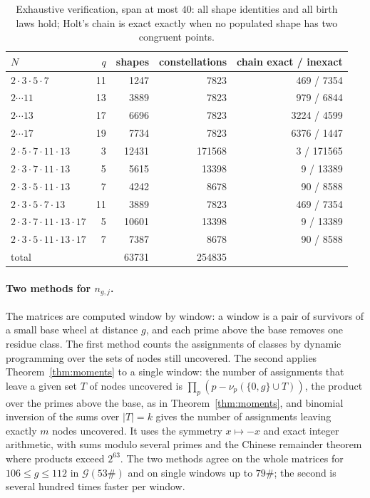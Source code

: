 \documentclass[11pt]{article}
\theoremstyle{definition}
\theoremstyle{remark}
\newcommand{\G}{\mathcal{G}}
\begin{document}
\begin{table}[ht]
\centering
\begin{tabular}{lrrrr}
\toprule
$N$ & $q$ & shapes & constellations & chain exact / inexact \\
\midrule
$2 \cdot 3 \cdot 5 \cdot 7$ & 11 & 1247 & 7823 & 469 / 7354 \\
$2 \cdots 11$ & 13 & 3889 & 7823 & 979 / 6844 \\
$2 \cdots 13$ & 17 & 6696 & 7823 & 3224 / 4599 \\
$2 \cdots 17$ & 19 & 7734 & 7823 & 6376 / 1447 \\
$2 \cdot 5 \cdot 7 \cdot 11 \cdot 13$ & 3 & 12431 & 171568 & 3 / 171565 \\
$2 \cdot 3 \cdot 7 \cdot 11 \cdot 13$ & 5 & 5615 & 13398 & 9 / 13389 \\
$2 \cdot 3 \cdot 5 \cdot 11 \cdot 13$ & 7 & 4242 & 8678 & 90 / 8588 \\
$2 \cdot 3 \cdot 5 \cdot 7 \cdot 13$ & 11 & 3889 & 7823 & 469 / 7354 \\
$2 \cdot 3 \cdot 7 \cdot 11 \cdot 13 \cdot 17$ & 5 & 10601 & 13398 & 9 / 13389 \\
$2 \cdot 3 \cdot 5 \cdot 11 \cdot 13 \cdot 17$ & 7 & 7387 & 8678 & 90 / 8588 \\
\midrule
total & & 63731 & 254835 & \\
\bottomrule
\end{tabular}
\caption{Exhaustive verification, span at most $40$: all shape identities and all birth laws hold; Holt's chain is exact exactly when no populated shape has two congruent points.}\label{tab:exhaustive}
\end{table}


\paragraph{Two methods for $n_{g,j}$.} The matrices are computed window by window: a window is a pair of survivors of a small base wheel at distance $g$, and each prime above the base removes one residue class. The first method counts the assignments of classes by dynamic programming over the sets of nodes still uncovered. The second applies Theorem~\ref{thm:moments} to a single window: the number of assignments that leave a given set $T$ of nodes uncovered is $\prod_p (p - \nu_p(\{0, g\} \cup T))$, the product over the primes above the base, as in Theorem~\ref{thm:moments}, and binomial inversion of the sums over $|T| = k$ gives the number of assignments leaving exactly $m$ nodes uncovered. It uses the symmetry $x \mapsto -x$ and exact integer arithmetic, with sums modulo several primes and the Chinese remainder theorem where products exceed $2^{63}$. The two methods agree on the whole matrices for $106 \le g \le 112$ in $\G(53\#)$ and on single windows up to $79\#$; the second is several hundred times faster per window.
\end{document}
